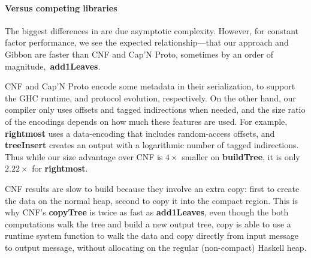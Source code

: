 \documentclass[showabstract,showacknowledgments,showpreface,showdedication]{iuphd}
\theoremstyle{nonumberplain}
\begin{document}
\paragraph{Versus competing libraries}


The biggest differences in  are due
asymptotic complexity.
However, for constant factor performance, we see the expected
relationship---that our approach and Gibbon are faster than CNF and Cap'N Proto,
sometimes by an order of magnitude, \eg\,{\bf add1Leaves}.

CNF and Cap'N Proto encode some metadata in their serialization, to
support the GHC runtime, and protocol evolution, respectively.
On the other hand, 
our compiler only uses offsets and tagged indirections
when needed, and the size ratio of the encodings depends on how much these features are used.
%
For example, {\bf rightmost} uses a data-encoding that includes random-access
offsets, and {\bf treeInsert} creates an output with a logarithmic number of
tagged indirections.  Thus while our size advantage over CNF is
%
$4\times$ smaller
%
on {\bf buildTree}, it is only
%
$2.22\times$
%
for {\bf rightmost}.

CNF results are slow to build because they involve an extra copy: first to
create the data on the normal heap, second to copy it into the compact region.
This is why CNF's {\bf copyTree} is twice as fast as {\bf add1Leaves}, even
though the both computations walk the tree and build a new output tree, copy is
able to use a runtime system function to walk the data and copy directly from
input message to output message, without allocating on the regular (non-compact)
Haskell heap.
\end{document}
